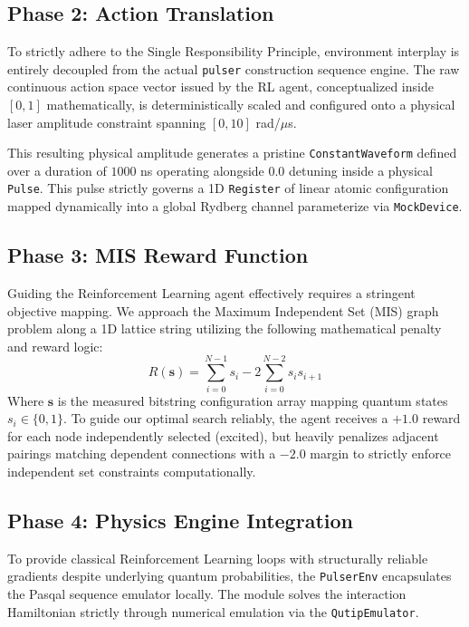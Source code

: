 \documentclass{article}
\begin{document}
\subsection{Phase 2: Action Translation}
To strictly adhere to the Single Responsibility Principle, environment interplay is entirely decoupled from the actual \texttt{pulser} construction sequence engine. The raw continuous action space vector issued by the RL agent, conceptualized inside $[0, 1]$ mathematically, is deterministically scaled and configured onto a physical laser amplitude constraint spanning $[0, 10]$ rad/$\mu$s.

This resulting physical amplitude generates a pristine \texttt{ConstantWaveform} defined over a duration of $1000$ ns operating alongside $0.0$ detuning inside a physical \texttt{Pulse}. This pulse strictly governs a 1D \texttt{Register} of linear atomic configuration mapped dynamically into a global Rydberg channel parameterize via \texttt{MockDevice}.

\subsection{Phase 3: MIS Reward Function}
Guiding the Reinforcement Learning agent effectively requires a stringent objective mapping. We approach the Maximum Independent Set (MIS) graph problem along a 1D lattice string utilizing the following mathematical penalty and reward logic:
\begin{equation}
    R(\mathbf{s}) = \sum_{i=0}^{N-1} s_i - 2 \sum_{i=0}^{N-2} s_i s_{i+1}
\end{equation}
Where $\mathbf{s}$ is the measured bitstring configuration array mapping quantum states $s_i \in \{0, 1\}$. To guide our optimal search reliably, the agent receives a $+1.0$ reward for each node independently selected (excited), but heavily penalizes adjacent pairings matching dependent connections with a $-2.0$ margin to strictly enforce independent set constraints computationally.

\subsection{Phase 4: Physics Engine Integration}
To provide classical Reinforcement Learning loops with structurally reliable gradients despite underlying quantum probabilities, the \texttt{PulserEnv} encapsulates the Pasqal sequence emulator locally. The module solves the interaction Hamiltonian strictly through numerical emulation via the \texttt{QutipEmulator}. 
\end{document}
